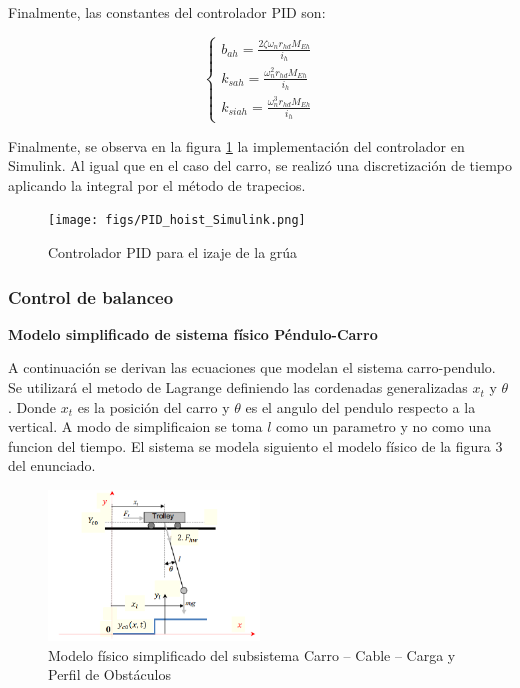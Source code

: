 \documentclass{article}
\begin{document}
            Finalmente, las constantes del controlador PID son:
            
            \begin{equation}
                \begin{cases}
                    b_{ah} = \frac{2 \zeta \omega_n r_{hd} M_{Eh}}{i_h} \\
                    k_{sah} = \frac{\omega_n^2 r_{hd} M_{Eh}}{i_h} \\
                    k_{siah} = \frac{\omega_n^3 r_{hd} M_{Eh}}{i_h}
                \end{cases}
            \end{equation}

            Finalmente, se observa en la figura \ref{fig:pid_hoist_simulink} la implementación del controlador en Simulink. Al igual que en el caso del carro, se realizó una discretización de tiempo aplicando la integral por el método de trapecios.

            \begin{figure}[H]
                \centering
                \texttt{[image: figs/PID\_hoist\_Simulink.png]}
                \caption{Controlador PID para el izaje de la grúa}
                \label{fig:pid_hoist_simulink}
            \end{figure}
        


        \subsubsection{Control de balanceo}

        \textbf{Modelo simplificado de sistema físico Péndulo-Carro}

            A continuación se derivan las ecuaciones que modelan el sistema carro-pendulo. Se utilizará el metodo de Lagrange definiendo las cordenadas generalizadas 
            \(x_t\) y \(\theta\) . Donde \(x_t\) es la posición del carro y \(\theta\) es el angulo del pendulo respecto a la vertical. 
            A modo de simplificaion se toma \(l\) como un parametro y no como una funcion del tiempo.
            El sistema se modela siguiento el modelo físico de la figura 3 del enunciado.
            \begin{figure}[H]
                \centering
                \includegraphics[width=0.5\textwidth]{figs/figure3_enunciado.png}
                \caption{Modelo físico simplificado del subsistema Carro – Cable – Carga y Perfil de Obstáculos}
                \label{fig:pendulo}
            \end{figure}
            
\end{document}
